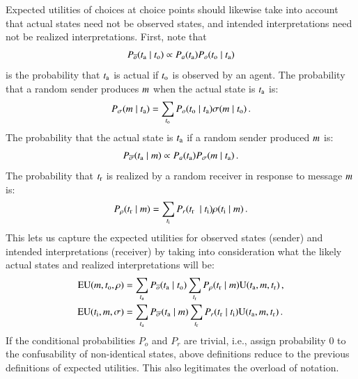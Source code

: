 \documentclass[fleqn,reqno,10pt]{article}
\begin{document}
Expected utilities of choices at choice points should likewise take into account that actual states
need not be observed states, and intended interpretations need not be realized
interpretations. First, note that
\begin{align*}
  P_{\overline{o}}(t_{\mathrm{a}} \mid t_{\mathrm{o}}) \propto P_a(t_{\mathrm{a}}) P_o(t_{\mathrm{o}}
    \mid t_{\mathrm{a}})
\end{align*}
is the probability that $t_{\mathrm{a}}$ is actual if $t_{\mathrm{o}}$ is observed by an agent. The
probability that a random sender produces $m$ when the actual state is $t_{\mathrm{a}}$ is:
\begin{align*}
  P_{\sigma}(m \mid t_{\mathrm{a}}) = \sum_{t_{\mathrm{o}}} P_o(t_{\mathrm{o}} \mid
  t_{\mathrm{a}}) \sigma(m \mid t_{\mathrm{o}})\,. 
\end{align*}
The probability that the actual state is $t_{\mathrm{a}}$ if a random sender produced $m$ is:
\begin{align*}
  P_{\overline{\sigma}}(t_{\mathrm{a}} \mid m) \propto P_a(t_{\mathrm{a}})
  P_{\sigma}(m \mid t_{\mathrm{a}})\,. 
\end{align*}
The probability that $t_{\mathrm{r}}$ is realized by a random receiver in response to
message $m$ is:
\begin{align*}
  P_{\rho}(t_{\mathrm{r}} \mid m) = \sum_{t_{\mathrm{i}}} P_r(t_{\mathrm{r}} \ \mid
  t_{\mathrm{i}}) \rho(t_{\mathrm{i}} \mid m)\,.
\end{align*}
This lets us capture the expected utilities for observed states (sender) and intended
interpretations (receiver) by taking into consideration what the likely actual states and
realized interpretations will be:
\begin{align*}
  \mathrm{EU}(m , t_{\mathrm{o}}, \rho) & = \sum_{t_{\mathrm{a}}}  P_{\overline{o}}(t_{\mathrm{a}}
  \mid t_{\mathrm{o}}) \sum_{t_{\mathrm{r}}}  P_{\rho}(t_{\mathrm{r}} \mid
  m) \mathrm{U}(t_{\mathrm{a}}, m, t_{\mathrm{r}})\,, \\
  \mathrm{EU}(t_{\mathrm{i}} , m, \sigma) & = \sum_{t_{\mathrm{a}}}
  P_{\overline{\sigma}}(t_{\mathrm{a}} \mid m) \sum_{t_{\mathrm{r}}}
  P_{r}(t_{\mathrm{r}} \mid t_{\mathrm{i}})  \mathrm{U}(t_{\mathrm{a}}, m, t_{\mathrm{r}})\,.
\end{align*}
If the conditional probabilities $P_o$ and $P_r$ are trivial, i.e., assign probability 0 to the
confusability of non-identical states, above definitions reduce to the
previous definitions of expected utilities. This also legitimates the overload of notation.
\end{document}
